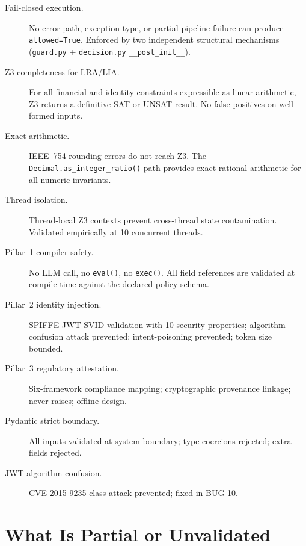 \documentclass[12pt,a4paper,oneside]{report}
\newcommand{\fname}[1]{\texttt{#1}}          %
\newcommand{\code}[1]{\texttt{#1}}           %
\begin{document}
\begin{description}
  \item[Fail-closed execution.] No error path, exception type, or partial
    pipeline failure can produce \code{allowed=True}.  Enforced by two
    independent structural mechanisms (\fname{guard.py} + \fname{decision.py}
    \code{\_\_post\_init\_\_}).

  \item[Z3 completeness for LRA/LIA.] For all financial and identity
    constraints expressible as linear arithmetic, Z3 returns a definitive
    SAT or UNSAT result.  No false positives on well-formed inputs.

  \item[Exact arithmetic.] IEEE~754 rounding errors do not reach Z3.  The
    \code{Decimal.as\_integer\_ratio()} path provides exact rational arithmetic
    for all numeric invariants.

  \item[Thread isolation.] Thread-local Z3 contexts prevent cross-thread
    state contamination.  Validated empirically at 10 concurrent threads.

  \item[Pillar~1 compiler safety.] No LLM call, no \code{eval()}, no
    \code{exec()}.  All field references are validated at compile time against
    the declared policy schema.

  \item[Pillar~2 identity injection.] SPIFFE JWT-SVID validation with 10
    security properties; algorithm confusion attack prevented; intent-poisoning
    prevented; token size bounded.

  \item[Pillar~3 regulatory attestation.] Six-framework compliance mapping;
    cryptographic provenance linkage; never raises; offline design.

  \item[Pydantic strict boundary.] All inputs validated at system boundary;
    type coercions rejected; extra fields rejected.

  \item[JWT algorithm confusion.] CVE-2015-9235 class attack prevented; fixed
    in BUG-10.
\end{description}

\section{What Is Partial or Unvalidated}
\end{document}
